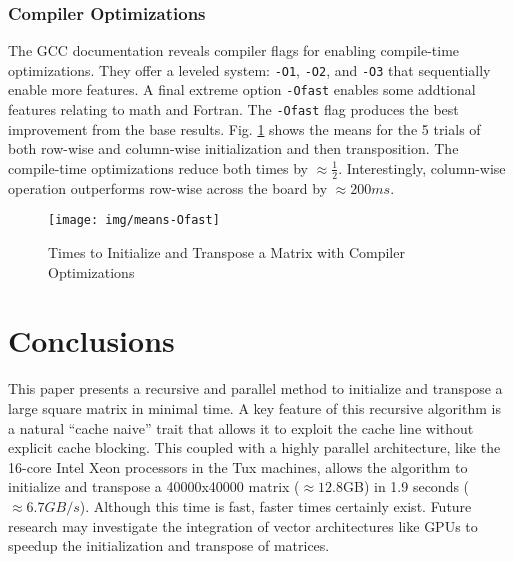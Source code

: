 \documentclass[conference]{IEEEtran}
\begin{document}
\subsubsection{Compiler Optimizations}\label{compiler-optimizations}

The GCC documentation reveals compiler flags for enabling compile-time
optimizations. They offer a leveled system: \texttt{-O1}, \texttt{-O2},
and \texttt{-O3} that sequentially enable more features. A final extreme
option \texttt{-Ofast} enables some addtional features relating to math
and Fortran. The \texttt{-Ofast} flag produces the best improvement from
the base results. Fig. \ref{means-Ofast} shows the means for the 5
trials of both row-wise and column-wise initialization and then
transposition. The compile-time optimizations reduce both times by
\(\approx \frac{1}{2}\). Interestingly, column-wise operation
outperforms row-wise across the board by \(\approx 200ms\).

\begin{figure}[ht]
\centering
\caption{Times to Initialize and Transpose a Matrix with Compiler Optimizations}
\label{means-Ofast}
\texttt{[image: img/means-Ofast]}
\end{figure}

\section{Conclusions}\label{conclusions}

This paper presents a recursive and parallel method to initialize and
transpose a large square matrix in minimal time. A key feature of this
recursive algorithm is a natural ``cache naive'' trait that allows it to
exploit the cache line without explicit cache blocking. This coupled
with a highly parallel architecture, like the 16-core Intel Xeon
processors in the Tux machines, allows the algorithm to initialize and
transpose a 40000x40000 matrix (\(\approx 12.8\)GB) in 1.9 seconds
(\(\approx 6.7GB/s\)). Although this time is fast, faster times
certainly exist. Future research may investigate the integration of
vector architectures like GPUs to speedup the initialization and
transpose of matrices.
\end{document}
